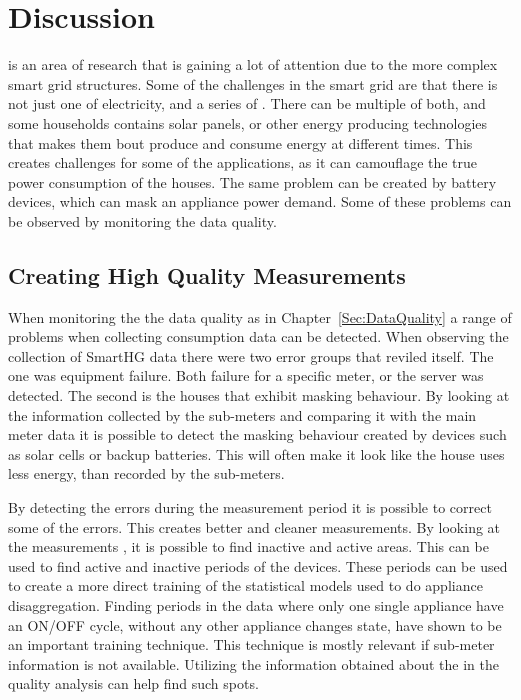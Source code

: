 \chapter{Discussion}

 is an area of research that is gaining a lot of attention due to the more complex smart grid structures. Some of the challenges in the smart grid are that there is not just one  of electricity, and a series of . There can be multiple of both, and some households contains solar panels, or other energy producing technologies that makes them bout produce and consume energy at different times. This creates challenges for some of the  applications, as it can camouflage the true power consumption of the houses. The same problem can be created by battery devices, which can mask an appliance power demand. Some of these problems can be observed by monitoring the data quality.

\section{Creating High Quality Measurements}
When monitoring the the data quality as in Chapter~\ref{Sec:DataQuality} a range of problems when collecting consumption data can be detected. When observing the collection of SmartHG data there were two error groups that reviled itself. The one was equipment failure. Both failure for a specific meter, or the server was detected. The second is the houses that exhibit masking behaviour. By looking at the information collected by the sub-meters and comparing it with the main meter data it is possible to detect the masking behaviour created by devices such as solar cells or backup batteries. This will often make it look like the house uses less energy, than recorded by the sub-meters. 

By detecting the errors during the measurement period it is possible to correct some of the errors. This creates better and cleaner measurements. By looking at the measurements , it is possible to find inactive and active areas. This can be used to find active and inactive periods of the devices. These periods can be used to create a more direct training of the statistical models used to do appliance disaggregation. Finding periods in the data where only one single appliance have an ON/OFF cycle, without any other appliance changes state, have shown to be an important training technique. This technique is mostly relevant if sub-meter information is not available. Utilizing the information obtained about the  in the quality analysis can help find such spots.

